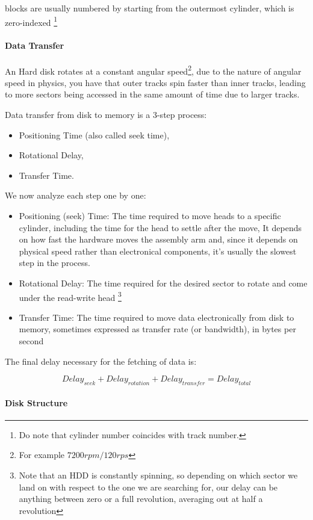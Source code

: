 \documentclass[openright, twoside]{report}
\theoremstyle{definition}
\theoremstyle{example}
\begin{document}
blocks are usually numbered by starting from the outermost cylinder, which is zero-indexed \footnote{Do note that cylinder number coincides with track number.}

\paragraph{Data Transfer}
An Hard disk rotates at a constant angular speed\footnote{For example $7200rpm/120rps$}, due to the nature of angular speed in physics, you have that 
outer tracks spin faster than inner tracks, leading to more sectors being accessed in the same amount of time due to larger tracks.

Data transfer from disk to memory is a 3-step process:
\begin{itemize}
	\item Positioning Time (also called seek time),
	\item Rotational Delay,
	\item Transfer Time.
\end{itemize}

We now analyze each step one by one:

\begin{itemize}
	\item Positioning (seek) Time:
	The time required to move heads to a specific cylinder, including the time for the head to settle after the move,
	It depends on how fast the hardware moves the assembly arm and, since it depends on physical speed rather than electronical components, it's usually the 
	slowest step in the process.
	\item Rotational Delay:
	The time required for the desired sector to rotate and come under the read-write head \footnote{Note that an HDD is constantly spinning, so depending on which 
	sector we land on with respect to the one we are searching for, our delay can be anything between zero or a full revolution, averaging out at half a revolution}\
	\item Transfer Time:
	The time required to move data electronically from disk to memory, sometimes expressed as transfer rate (or bandwidth), in bytes per second
\end{itemize}
The final delay necessary for the fetching of data is:

\[
	Delay_{seek} + Delay_{rotation} + Delay_{transfer} = Delay_{total}
	\]

\paragraph{Disk Structure}
\end{document}

